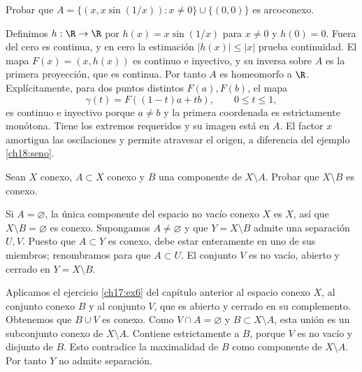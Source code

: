 \begin{ejercicio}
Probar que $A=\{(x,x\sin(1/x)):x\ne0\}\cup\{(0,0)\}$ es arcoconexo.
\end{ejercicio}
\begin{solucion}
Definimos $h:\R\to\R$ por $h(x)=x\sin(1/x)$ para $x\ne0$ y $h(0)=0$. Fuera del cero es continua, y en cero la estimación $|h(x)|\le|x|$ prueba continuidad. El mapa $F(x)=(x,h(x))$ es continuo e inyectivo, y su inversa sobre $A$ es la primera proyección, que es continua. Por tanto $A$ es homeomorfo a $\R$. Explícitamente, para dos puntos distintos $F(a),F(b)$, el mapa
\[
\gamma(t)=F((1-t)a+tb),\qquad0\le t\le1,
\]
es continuo e inyectivo porque $a\ne b$ y la primera coordenada es estrictamente monótona. Tiene los extremos requeridos y su imagen está en $A$. El factor $x$ amortigua las oscilaciones y permite atravesar el origen, a diferencia del ejemplo \ref{ch18:seno}.
\end{solucion}

\begin{ejercicio}
Sean $X$ conexo, $A\subset X$ conexo y $B$ una componente de $X\setminus A$. Probar que $X\setminus B$ es conexo.
\end{ejercicio}
\begin{solucion}
Si $A=\varnothing$, la única componente del espacio no vacío conexo $X$ es $X$, así que $X\setminus B=\varnothing$ es conexo. Supongamos $A\ne\varnothing$ y que $Y=X\setminus B$ admite una separación $U,V$. Puesto que $A\subset Y$ es conexo, debe estar enteramente en uno de sus miembros; renombramos para que $A\subset U$. El conjunto $V$ es no vacío, abierto y cerrado en $Y=X\setminus B$.

Aplicamos el ejercicio \ref{ch17:ex6} del capítulo anterior al espacio conexo $X$, al conjunto conexo $B$ y al conjunto $V$, que es abierto y cerrado en su complemento. Obtenemos que $B\cup V$ es conexo. Como $V\cap A=\varnothing$ y $B\subset X\setminus A$, esta unión es un subconjunto conexo de $X\setminus A$. Contiene estrictamente a $B$, porque $V$ es no vacío y disjunto de $B$. Esto contradice la maximalidad de $B$ como componente de $X\setminus A$. Por tanto $Y$ no admite separación.
\end{solucion}

